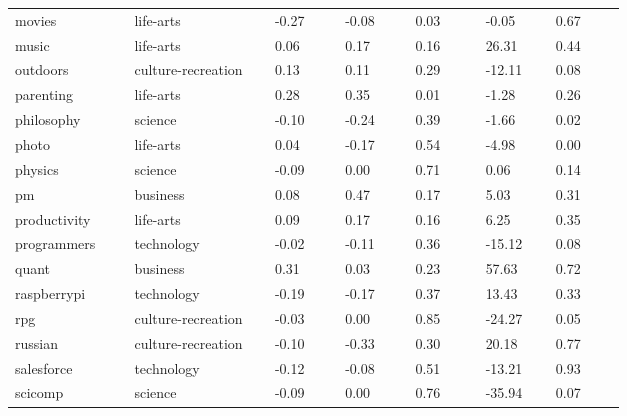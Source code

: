 \begin{longtabu}{@{}
	p{0.17\linewidth}
	p{0.2\linewidth}
	P{0.1\linewidth}
	P{0.1\linewidth}
	P{0.1\linewidth}
	P{0.1\linewidth}
	p{0.1\linewidth}@{}}
movies           & life-arts          & -0.27          & -0.08          & 0.03   & -0.05             & 0.67             \\
music            & life-arts          & 0.06           & 0.17           & 0.16   & 26.31             & 0.44             \\
outdoors         & culture-recreation & 0.13           & 0.11           & 0.29   & -12.11            & 0.08             \\
parenting        & life-arts          & 0.28           & 0.35           & 0.01   & -1.28             & 0.26             \\
philosophy       & science            & -0.10          & -0.24          & 0.39   & -1.66             & 0.02             \\
photo            & life-arts          & 0.04           & -0.17          & 0.54   & -4.98             & 0.00             \\
physics          & science            & -0.09          & 0.00           & 0.71   & 0.06              & 0.14             \\
pm               & business           & 0.08           & 0.47           & 0.17   & 5.03              & 0.31             \\
productivity     & life-arts          & 0.09           & 0.17           & 0.16   & 6.25              & 0.35             \\
programmers      & technology         & -0.02          & -0.11          & 0.36   & -15.12            & 0.08             \\
quant            & business           & 0.31           & 0.03           & 0.23   & 57.63             & 0.72             \\
raspberrypi      & technology         & -0.19          & -0.17          & 0.37   & 13.43             & 0.33             \\
rpg              & culture-recreation & -0.03          & 0.00           & 0.85   & -24.27            & 0.05             \\
russian          & culture-recreation & -0.10          & -0.33          & 0.30   & 20.18             & 0.77             \\
salesforce       & technology         & -0.12          & -0.08          & 0.51   & -13.21            & 0.93             \\
scicomp          & science            & -0.09          & 0.00           & 0.76   & -35.94            & 0.07             \\

\end{longtabu}
